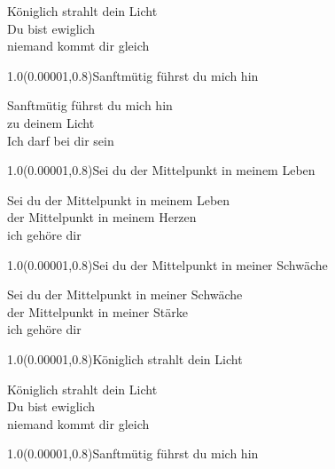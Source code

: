 \documentclass[aspectratio=169]{beamer}
\begin{document}
\color{white}
\begin{frame}
\centering
\color{white}
\huge{Königlich strahlt dein Licht} \\
\huge{Du bist ewiglich} \\
\huge{niemand kommt dir gleich} \\

\begin{textblock}{1.0}(0.00001,0.8)\color{gray}\normalsize{Sanftmütig führst du mich hin}\end{textblock}
\end{frame}

\begin{frame}
\centering
\color{white}
\huge{Sanftmütig führst du mich hin} \\
\huge{zu deinem Licht} \\
\huge{Ich darf bei dir sein} \\

\begin{textblock}{1.0}(0.00001,0.8)\color{gray}\normalsize{Sei du der Mittelpunkt in meinem Leben}\end{textblock}
\end{frame}

\begin{frame}
\centering
\color{white}
\huge{Sei du der Mittelpunkt in meinem Leben} \\
\huge{der Mittelpunkt in meinem Herzen} \\
\huge{ich gehöre dir} \\

\begin{textblock}{1.0}(0.00001,0.8)\color{gray}\normalsize{Sei du der Mittelpunkt in meiner Schwäche}\end{textblock}
\end{frame}

\begin{frame}
\centering
\color{white}
\huge{Sei du der Mittelpunkt in meiner Schwäche} \\
\huge{der Mittelpunkt in meiner Stärke} \\
\huge{ich gehöre dir} \\

\begin{textblock}{1.0}(0.00001,0.8)\color{gray}\normalsize{Königlich strahlt dein Licht}\end{textblock}
\end{frame}

\begin{frame}
\centering
\color{white}
\huge{Königlich strahlt dein Licht} \\
\huge{Du bist ewiglich} \\
\huge{niemand kommt dir gleich} \\

\begin{textblock}{1.0}(0.00001,0.8)\color{gray}\normalsize{Sanftmütig führst du mich hin}\end{textblock}
\end{frame}
\end{document}

